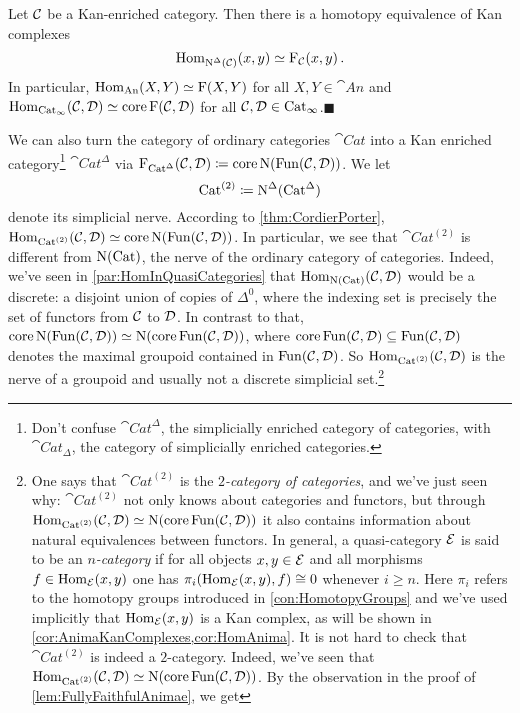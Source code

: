 \begin{thm}\label{thm:CordierPorter}
	Let $\mathcal{C}$ be a Kan-enriched category. Then there is a homotopy equivalence of Kan complexes
	\begin{equation*}
		\operatorname{Hom}_{\operatorname{N}^\Delta(\mathcal{C})}(x,y)\simeq \operatorname{F}_{\mathcal{C}}(x,y)\,.
	\end{equation*}
	In particular, $\operatorname{Hom}_{\mathrm{An}}(X,Y)\simeq \operatorname{F}(X,Y)$ for all $X,Y\in\cat{An}$ and $\operatorname{Hom}_{\mathrm{Cat}_\infty}(\mathcal{C},\mathcal{D})\simeq \operatorname{core}\operatorname{F}(\mathcal{C},\mathcal{D})$ for all $\mathcal{C},\mathcal{D}\in\mathrm{Cat}_\infty$.\hfill$\blacksquare$
\end{thm}
\begin{exm}\label{exm:CatAs2Category}
	We can also turn the category of ordinary categories $\cat{Cat}$ into a Kan enriched category\footnote{Don't confuse $\cat{Cat}^\Delta$, the simplicially enriched category of categories, with $\cat{Cat}_\Delta$, the category of simplicially enriched categories.} $\cat{Cat}^\Delta$ via $\operatorname{F}_{\mathrm{Cat}^\Delta}(\mathcal{C},\mathcal{D})\coloneqq \operatorname{core}\operatorname{N}(\operatorname{Fun}(\mathcal{C},\mathcal{D}))$. We let
	\begin{equation*}
		\mathrm{Cat}^{(2)}\coloneqq \operatorname{N}^\Delta(\mathrm{Cat}^\Delta)
	\end{equation*}
	denote its simplicial nerve. According to \cref{thm:CordierPorter}, $\operatorname{Hom}_{\mathrm{Cat}^{(2)}}(\mathcal{C},\mathcal{D})\simeq \operatorname{core}\operatorname{N}(\operatorname{Fun}(\mathcal{C},\mathcal{D}))$. In particular, we see that $\cat{Cat}^{(2)}$ is different from $\operatorname{N}(\mathrm{Cat})$, the nerve of the ordinary category of categories. Indeed, we've seen in \cref{par:HomInQuasiCategories} that $\operatorname{Hom}_{\operatorname{N}(\mathrm{Cat})}(\mathcal{C},\mathcal{D})$ would be a discrete: a disjoint union of copies of $\Delta^0$, where the indexing set is precisely the set of functors from $\mathcal{C}$ to $\mathcal{D}$. In contrast to that, $\operatorname{core}\operatorname{N}(\operatorname{Fun}(\mathcal{C},\mathcal{D}))\simeq \operatorname{N}(\operatorname{core} \operatorname{Fun}(\mathcal{C},\mathcal{D}))$, where $\operatorname{core} \operatorname{Fun}(\mathcal{C},\mathcal{D})\subseteq \operatorname{Fun}(\mathcal{C},\mathcal{D})$ denotes the maximal groupoid contained in $\operatorname{Fun}(\mathcal{C},\mathcal{D})$. So $\operatorname{Hom}_{\mathrm{Cat}^{(2)}}(\mathcal{C},\mathcal{D})$ is the nerve of a groupoid and usually not a discrete simplicial set.\footnote{One says that $\cat{Cat}^{(2)}$ is the \emph{$2$-category of categories}, and we've just seen why: $\cat{Cat}^{(2)}$ not only knows about categories and functors, but through $\operatorname{Hom}_{\mathrm{Cat}^{(2)}}(\mathcal{C},\mathcal{D})\simeq \operatorname{N}(\operatorname{core}\operatorname{Fun}(\mathcal{C},\mathcal{D}))$ it also contains information about natural equivalences between functors. In general, a quasi-category $\mathcal{E}$ is said to be an \emph{$n$-category} if for all objects $x,y\in \mathcal{E}$ and all morphisms $f\in\operatorname{Hom}_{\mathcal{E}}(x,y)$ one has $\pi_i(\operatorname{Hom}_{\mathcal{E}}(x,y),f)\cong 0$ whenever $i\geqslant n$. Here $\pi_i$ refers to the homotopy groups introduced in \cref{con:HomotopyGroups} and we've used implicitly that $\operatorname{Hom}_{\mathcal{E}}(x,y)$ is a Kan complex, as will be shown in \cref{cor:AnimaKanComplexes,cor:HomAnima}. It is not hard to check that $\cat{Cat}^{(2)}$ is indeed a $2$-category. Indeed, we've seen that $\operatorname{Hom}_{\mathrm{Cat}^{(2)}}(\mathcal{C},\mathcal{D})\simeq \operatorname{N}(\operatorname{core}\operatorname{Fun}(\mathcal{C},\mathcal{D}))$. By the observation in the proof of \cref{lem:FullyFaithfulAnimae}, we get
}
\end{exm}
